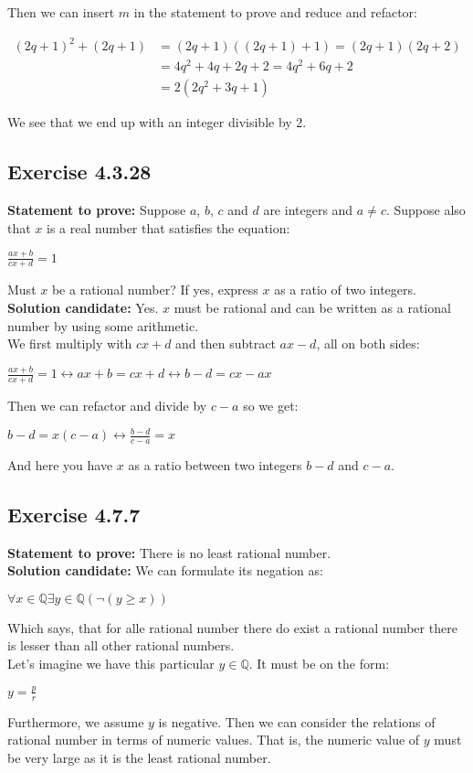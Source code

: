 \documentclass{report}
\newcommand{\cent}[1]{\begin{center}#1\end{center}}
\newcommand{\mAlign}[1]{\begin{align*}#1\end{align*}}
\newcommand{\doubleQ}{\mathbb{Q}}
\newcommand{\In}{\! \in \!}
\newcommand{\Prove}{\textbf{Statement to prove: }}
\newcommand{\Solution}{\textbf{Solution candidate: }}
\newcommand{\QED}{\boxed{}}
\newcommand{\Exercise}[1]{\subsection{Exercise #1}}
\begin{document}
	Then we can insert $m$ in the statement to prove and reduce and refactor:
	
	\mAlign{(2q+1)^2 + (2q+1) &= (2q+1)((2q+1) + 1) = (2q+1)(2q+2) \\
					&= 4q^2 +4q + 2q +2 = 4q^2 +6q + 2 \\
					&= 2(2q^2+3q + 1)}
				
	We see that we end up with an integer divisible by 2.\\
	\QED
	
	\Exercise{4.3.28}
	
	\Prove
	Suppose $a$, $b$, $c$ and $d$ are integers and $a \neq c$. Suppose also that $x$ is a real number that satisfies the equation:
	
	\cent{$\frac{ax+b}{cx+d} = 1$}
	
	Must $x$ be a rational number? If yes, express $x$ as a ratio of two integers.\\
	
	\Solution
	Yes. $x$ must be rational and can be written as a rational number by using some arithmetic.\\
	
	We first multiply with $cx+d$ and then subtract $ax - d$, all on both sides:
	 
	\cent{$\frac{ax+b}{cx+d} = 1 \leftrightarrow ax+b = cx+d \leftrightarrow b - d = cx - ax$}
	
	Then we can refactor and divide by $c-a$ so we get:
	
	\cent{$b -d = x(c-a) \leftrightarrow \frac{b-d}{c-a} = x$}
	
	And here you have $x$ as a ratio between two integers $b-d$ and $c-a$.\\
	\QED
	
	\Exercise{4.7.7}
	
	\Prove
	There is no least rational number.\\
	
	\Solution
	We can formulate its negation as:
	
	\cent{$\forall x \In \doubleQ \exists y \in \doubleQ(\neg(y \geq x))$}
	
	Which says, that for alle rational number there do exist a rational number there is lesser than all other rational numbers.\\
	
	Let's imagine we have this particular $y \in \doubleQ$.  It must be on the form:
	
	\cent{$y = \frac{p}{r}$}
	
	Furthermore, we assume $y$ is negative. Then we can consider the relations of rational number in terms of numeric values. That is, the numeric value of $y$ must be very large as it is the least rational number. \\
	
\end{document}
